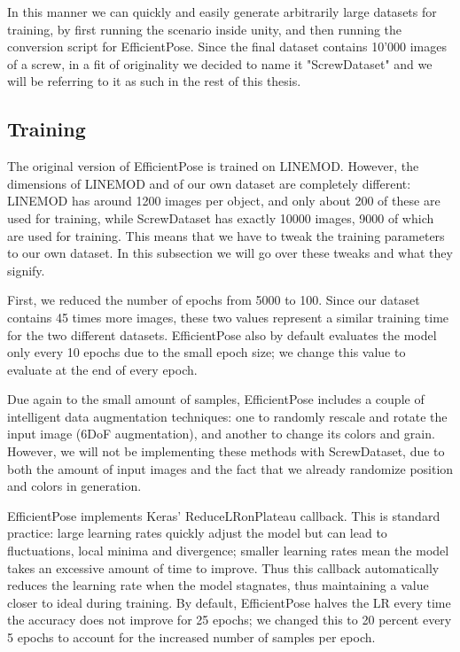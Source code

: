 In this manner we can quickly and easily generate arbitrarily large datasets for training, by first running the scenario inside unity, and then running the conversion script for EfficientPose. Since the final dataset contains 10'000 images of a screw, in a fit of originality we decided to name it "ScrewDataset" and we will be referring to it as such in the rest of this thesis.

\subsection{Training}

The original version of EfficientPose is trained on LINEMOD. However, the dimensions of LINEMOD and of our own dataset are completely different: LINEMOD has around 1200 images per object, and only about 200 of these are used for training, while ScrewDataset has exactly 10000 images, 9000 of which are used for training. This means that we have to tweak the training parameters to our own dataset. In this subsection we will go over these tweaks and what they signify.

First, we reduced the number of epochs from 5000 to 100. Since our dataset contains 45 times more images, these two values represent a similar training time for the two different datasets. EfficientPose also by default evaluates the model only every 10 epochs due to the small epoch size; we change this value to evaluate at the end of every epoch.

Due again to the small amount of samples, EfficientPose includes a couple of intelligent data augmentation techniques: one to randomly rescale and rotate the input image (6DoF augmentation), and another to change its colors and grain\cite{RandAugment}. However, we will not be implementing these methods with ScrewDataset, due to both the amount of input images and the fact that we already randomize position and colors in generation.

EfficientPose implements Keras' ReduceLRonPlateau callback. This is standard practice: large learning rates quickly adjust the model but can lead to fluctuations, local minima and divergence; smaller learning rates mean the model takes an excessive amount of time to improve\cite{ReduceLR}. Thus this callback automatically reduces the learning rate when the model stagnates, thus maintaining a value closer to ideal during training. By default, EfficientPose halves the LR every time the accuracy does not improve for 25 epochs; we changed this to 20 percent every 5 epochs to account for the increased number of samples per epoch.

